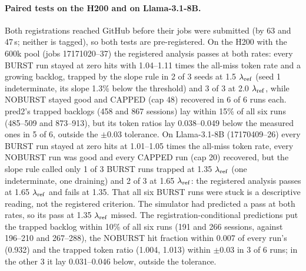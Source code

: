 \paragraph{Paired tests on the H200 and on Llama-3.1-8B.}\label{sec:h200llama} Both registrations reached GitHub before their jobs were submitted (by 63 and 47\,s; neither is tagged), so both tests are pre-registered. On the H200 with the 600k pool (jobs 17171020--37) the registered analysis passes at both rates: every BURST run stayed at zero hits with 1.04--1.11 times the all-miss token rate and a growing backlog, trapped by the slope rule in 2 of 3 seeds at 1.5 $\lambda_{\mathrm{ref}}$ (seed 1 indeterminate, its slope 1.3\% below the threshold) and 3 of 3 at 2.0 $\lambda_{\mathrm{ref}}$, while NOBURST stayed good and CAPPED (cap 48) recovered in 6 of 6 runs each. pred2's trapped backlogs (458 and 867 sessions) lay within 15\% of all six runs (485--509 and 873--913), but its token ratios lay 0.038--0.049 below the measured ones in 5 of 6, outside the $\pm0.03$ tolerance. On Llama-3.1-8B (17170409--26) every BURST run stayed at zero hits at 1.01--1.05 times the all-miss token rate, every NOBURST run was good and every CAPPED run (cap 20) recovered, but the slope rule called only 1 of 3 BURST runs trapped at 1.35 $\lambda_{\mathrm{ref}}$ (one indeterminate, one draining) and 2 of 3 at 1.65 $\lambda_{\mathrm{ref}}$: the registered analysis passes at 1.65 $\lambda_{\mathrm{ref}}$ and fails at 1.35. That all six BURST runs were stuck is a descriptive reading, not the registered criterion. The simulator had predicted a pass at both rates, so its pass at 1.35 $\lambda_{\mathrm{ref}}$ missed. The registration-conditional predictions put the trapped backlog within 10\% of all six runs (191 and 266 sessions, against 196--210 and 267--288), the NOBURST hit fraction within 0.007 of every run's (0.932) and the trapped token ratio (1.004, 1.013) within $\pm0.03$ in 3 of 6 runs; in the other 3 it lay 0.031--0.046 below, outside the tolerance.

